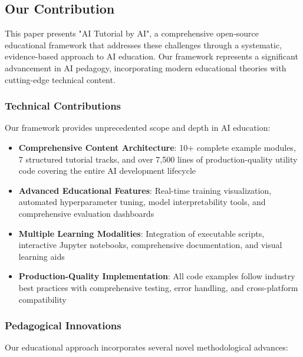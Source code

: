 \subsection{Our Contribution}

This paper presents "AI Tutorial by AI", a comprehensive open-source educational framework that addresses these challenges through a systematic, evidence-based approach to AI education. Our framework represents a significant advancement in AI pedagogy, incorporating modern educational theories with cutting-edge technical content.

\subsubsection{Technical Contributions}

Our framework provides unprecedented scope and depth in AI education:

\begin{itemize}
    \item \textbf{Comprehensive Content Architecture}: 10+ complete example modules, 7 structured tutorial tracks, and over 7,500 lines of production-quality utility code covering the entire AI development lifecycle
    \item \textbf{Advanced Educational Features}: Real-time training visualization, automated hyperparameter tuning, model interpretability tools, and comprehensive evaluation dashboards
    \item \textbf{Multiple Learning Modalities}: Integration of executable scripts, interactive Jupyter notebooks, comprehensive documentation, and visual learning aids
    \item \textbf{Production-Quality Implementation}: All code examples follow industry best practices with comprehensive testing, error handling, and cross-platform compatibility
\end{itemize}

\subsubsection{Pedagogical Innovations}

Our educational approach incorporates several novel methodological advances:

